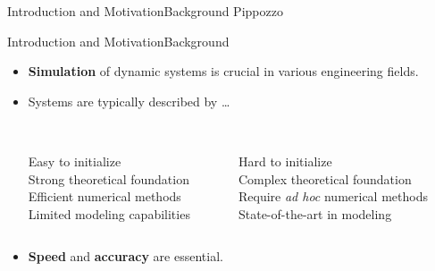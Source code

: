 

\begin{frame}{Introduction and Motivation}{Background}
  Pippozzo
\end{frame}

\begin{frame}{Introduction and Motivation}{Background}
  \begin{itemize}
    \item \textbf{Simulation} of dynamic systems is crucial in various engineering fields.
    \item Systems are typically described by \dots
    \vspace{1.0em}
    \begin{columns}
      \centering
      \begin{column}[t]{0.45\textwidth}
        \centering
         \\
        \centering\small
        \textcolor{mycolor5!95!black}{Easy to initialize} \\
        \textcolor{mycolor5!95!black}{Strong theoretical foundation} \\
        \textcolor{mycolor5!95!black}{Efficient numerical methods} \\
        \textcolor{mycolor2!95!black}{Limited modeling capabilities} \\ %
      \end{column}
      \begin{column}[t]{0.45\textwidth}
        \centering
         \\
        \centering\small
        \textcolor{mycolor2!90!black}{Hard to initialize} \\
        \textcolor{mycolor3!90!black}{Complex theoretical foundation} \\
        \textcolor{mycolor3!90!black}{Require \emph{ad hoc} numerical methods} \\
        \textcolor{mycolor5!90!black}{State-of-the-art in modeling} \\
      \end{column}
    \end{columns}
    \vspace{1.0em}
    \item \textbf{Speed} and \textbf{accuracy} are essential.
  \end{itemize}
  \vspace{0.5em}
\end{frame}


